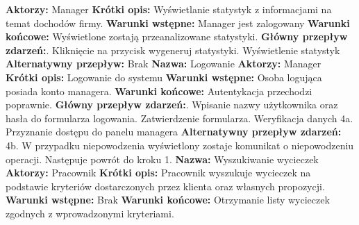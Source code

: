 \documentclass[polish,polish,a4paper]{article}
\begin{document}
\textbf{Aktorzy:} Manager\newline
\textbf{Krótki opis:} Wyświetlanie statystyk z informacjami na temat dochodów firmy.\newline
\textbf{Warunki wstępne:} Manager jest zalogowany\newline
\textbf{Warunki końcowe:} Wyświetlone zostają przeanalizowane statystyki.\newline
\textbf{Główny przepływ zdarzeń:}. Kliknięcie na przycisk wygeneruj statystyki. Wyświetlenie statystyk\newline
\textbf{Alternatywny przepływ:}\newline
Brak\newline
\newline
\textbf{Nazwa:} Logowanie\newline
\textbf{Aktorzy:} Manager\newline
\textbf{Krótki opis:} Logowanie do systemu\newline
\textbf{Warunki wstępne:} Osoba logująca posiada konto managera.\newline
\textbf{Warunki końcowe:} Autentykacja przechodzi poprawnie.\newline
\textbf{Główny przepływ zdarzeń:}. Wpisanie nazwy użytkownika oraz hasła do formularza logowania. Zatwierdzenie formularza. Weryfikacja danych\newline
4a. Przyznanie dostępu do panelu managera\newline
\textbf{Alternatywny przepływ zdarzeń:}\newline
4b. W przypadku niepowodzenia wyświetlony zostaje komunikat o niepowodzeniu operacji.\newline
Następuje powrót do kroku 1.\newline
\newline
\textbf{Nazwa:} Wyszukiwanie wycieczek\newline
\textbf{Aktorzy:} Pracownik\newline
\textbf{Krótki opis:} Pracownik wyszukuje wycieczek na podstawie kryteriów dostarczonych przez klienta oraz\newline
własnych propozycji.\newline
\textbf{Warunki wstępne:} Brak\newline
\textbf{Warunki końcowe:} Otrzymanie listy wycieczek zgodnych z wprowadzonymi kryteriami.\newline
\end{document}
